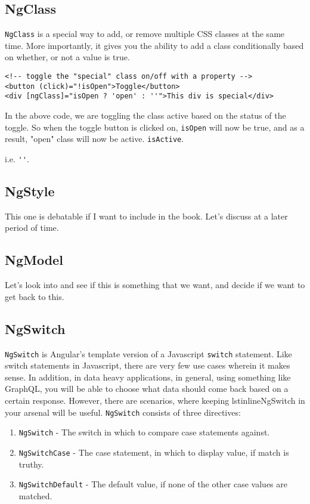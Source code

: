 \subsection{NgClass}
\lstinline{NgClass} is a special way to add, or remove multiple CSS classes 
at the same time. More importantly, it gives you the ability to add a class 
conditionally based on whether, or not a value is true. 
\begin{lstlisting}
<!-- toggle the "special" class on/off with a property -->
<button (click)="!isOpen">Toggle</button>
<div [ngClass]="isOpen ? 'open' : ''">This div is special</div>
\end{lstlisting}

In the above code, we are toggling the class active based on the status of 
the toggle. So when the toggle button is clicked on, \lstinline{isOpen} will 
now be true, and as a result, "open" class will now be active. 
\lstinline{isActive}. 

 i.e. \lstinline{''}. 

 \subsection{ NgStyle }
This one is debatable if I want to include in the book. Let's discuss at a
later period of time. 

\subsection{ NgModel }
Let's look into and see if this is something that we want, and decide if we 
want to get back to this. 

\subsection{ NgSwitch }
\lstinline{NgSwitch} is Angular's template version of a Javascript 
\lstinline{switch} statement. Like switch statements in Javascript, there are 
very few use cases wherein it makes sense. In addition, in data heavy 
applications, in general, using something like GraphQL, you will be able to 
choose what data should come back based on a certain response. However, there 
are scenarios, where keeping lstinline{NgSwitch} in your arsenal will be 
useful. \lstinline{NgSwitch} consists of three directives: 
\begin{enumerate}
  \item \lstinline{NgSwitch} - The switch in which to compare case statements against. 
  \item \lstinline{NgSwitchCase} - The case statement, in which to display 
  value, if match is truthy. 
  \item \lstinline{NgSwitchDefault} - The default value, if none of the other
  case values are matched. 
\end{enumerate}

